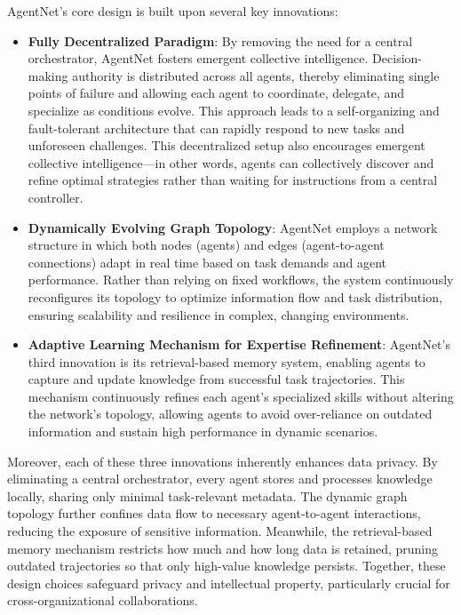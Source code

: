 \documentclass{article}
\begin{document}
AgentNet’s core design is built upon several key innovations:\vspace{-0.2cm}
\begin{itemize}[itemsep=0em]
    \item \textbf{Fully Decentralized Paradigm}: 
    By removing the need for a central orchestrator, AgentNet fosters emergent collective intelligence. Decision-making authority is distributed across all agents, thereby eliminating single points of failure and allowing each agent to coordinate, delegate, and specialize as conditions evolve. This approach leads to a self-organizing and fault-tolerant architecture that can rapidly respond to new tasks and unforeseen challenges. This decentralized setup also encourages emergent collective intelligence—in other words, agents can collectively discover and refine optimal strategies rather than waiting for instructions from a central controller.
    
    \item \textbf{Dynamically Evolving Graph Topology}: 
    AgentNet employs a network structure in which both nodes (agents) and edges (agent-to-agent connections) adapt in real time based on task demands and agent performance. Rather than relying on fixed workflows, the system continuously reconfigures its topology to optimize information flow and task distribution, ensuring scalability and resilience in complex, changing environments.
    
    \item \textbf{Adaptive Learning Mechanism for Expertise Refinement}: 
    AgentNet’s third innovation is its retrieval-based memory system, enabling agents to capture and update knowledge from successful task trajectories. This mechanism continuously refines each agent’s specialized skills without altering the network’s topology, allowing agents to avoid over-reliance on outdated information and sustain high performance in dynamic scenarios.
\end{itemize}

Moreover, each of these three innovations inherently enhances data privacy. By eliminating a central orchestrator, every agent stores and processes knowledge locally, sharing only minimal task-relevant metadata.  The dynamic graph topology further confines data flow to necessary agent-to-agent interactions, reducing the exposure of sensitive information.  Meanwhile, the retrieval-based memory mechanism restricts how much and how long data is retained, pruning outdated trajectories so that only high-value knowledge persists.  Together, these design choices safeguard privacy and intellectual property, particularly crucial for cross-organizational collaborations.
\end{document}
